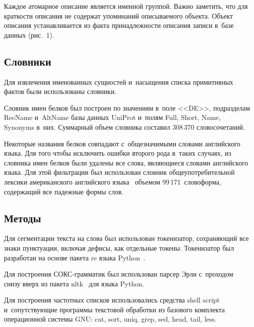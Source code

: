 \begin{multicols}{2}
  Каждое атомарное описание является именной группой. Важно заметить, что 
для краткости описания не содержат упоминаний описываемого объекта. 
Объект описания устанавливается из факта принадлежности описания записи 
в~базе данных (рис.~1). 
  
\vspace*{-14pt}
  
  \subsection{Словники}
  
  \vspace*{-6pt}
  
  Для извлечения именованных сущностей и~насыщения списка примитивных 
фактов были использованы словники.
  
  Словник имен белков был построен по значениям в~поле <<DE>>, подразделам 
RecName и~AltName
 базы данных UniProt и~полям Full, Short, Name, Synonyms 
в~них. Суммарный объем словника составил 308\,370 словосочетаний.
  
  Некоторые названия белков совпадают с~общезначимыми словами 
английского языка. Для того чтобы исключить ошибки второго рода в~таких 
случаях, из словника имен белков были удалены все слова, являющиеся 
словами английского языка. Для этой фильтрации был использован словник 
общеупотребительной лексики американского анг\-лий\-ско\-го языка~\cite{15-al} 
объемом 99\,171~словоформа, содержащий все падежные формы слов.

\vspace*{-6pt}
  
  \subsection{Методы}
  
  Для сегментации текста на слова был использован токенизатор, 
сохраняющий все знаки пунктуации, включая дефисы, как отдельные токены. 
Токенизатор был разработан на основе пакета re языка Python~\cite{16-al}.
  
  Для построения СОКС-грамматик был использован парсер Эрли с~проходом 
снизу вверх из пакета nltk~\cite{17-al} для языка Python.
  
  Для построения частотных списков использовались средства shell script 
и~сопутствующие программы текстовой обработки из базового комплекта операционной системы 
GNU: cat, sort, uniq, grep, sed, head, tail, less.

\vspace*{-6pt}
  

\end{multicols}
